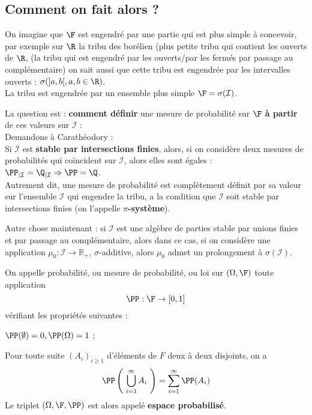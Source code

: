 \subsection*{Comment on fait alors ?}
On imagine que $\F$ est engendré par une partie qui est plus simple à concevoir, par exemple sur $\R$ la tribu des borélien (plus petite tribu qui contient les ouverts de $\R$, (\ie la tribu qui est engendré par les ouverts/par les fermés par passage au complémentaire) on sait aussi que cette tribu est engendrée par les intervalles ouverts : $\sigma(]a,b[, a,b \in \R)$. \\
La tribu est engendrée par un ensemble plus simple $\F = \sigma(\mathcal{I})$.

\bigskip

La question est : \textbf{comment définir} une mesure de probabilité sur $\F$ \textbf{à partir} de ces valeurs sur $\mathcal{I}$ : \\ Demandons à Carathéodory :\\ Si $\mathcal{I}$ est \textbf{stable par intersections finies}, alors, si on considère deux mesures de probabilités qui coïncident sur $\mathcal{I}$, alors elles sont égales : $\PP_{\mid\mathcal{I}} = \Q_{\mid\mathcal{I}} \Rightarrow \PP = \Q$.\\
Autrement dit, une mesure de probabilité est complètement définit par sa valeur sur l'ensemble $\mathcal{I}$ qui engendre la tribu, a la condition que $\mathcal{I}$ soit stable par intersections finies (on l'appelle \textbf{$\pi$-système}).

Autre chose maintenant : si $\mathcal{I}$ est une algèbre de parties stable par unions finies et par passage au complémentaire, alors dans ce cas, si on considère une application $\mu_0 : \mathcal{I} \to \mathbb{R}_+$, $\sigma$-additive, alors $\mu_0$ admet un prolongement à $\sigma(\mathcal{I})$.














\newpage

On appelle probabilité, ou mesure de probabilité, ou loi sur $(\Omega, \F)$ toute application $$ \PP : \F \to [0,1]$$ vérifiant les propriétés suivantes : 
\ben
    \item $\PP(\emptyset) = 0, \PP(\Omega) = 1$ ;
    \item Pour toute suite $(A_i)_{i\geq 1}$ d'éléments de $F$ deux à deux disjoints, on a $$\PP \left( ~ \bigcup\limits_{i=1}^{\infty} A_i ~ \right) = \sum_{i=1}^{\infty} \PP(A_i)$$
\een
Le triplet $(\Omega, \F, \PP)$ est alors appelé \textbf{espace probabilisé}.

